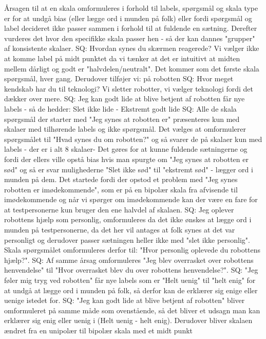 Årsagen til at en skala omformuleres i forhold til labels, spørgsmål og skala type er for at undgå bias (eller lægge ord i munden på folk) eller fordi spørgsmål og label decideret ikke passer sammen i forhold til at fuldende en sætning. Derefter vurderes det hvor den specifikke skala passer hen - så der kan dannes "grupper" af konsistente skalaer.\blankline 
%
SQ: Hvordan synes du skærmen reagerede? Vi vælger ikke at komme label på midt punktet da vi tænker at det er intuitivt at midten mellem dårligt og godt er "halvdelen/neutralt". Det kommer som det første skala spørgsmål, hver gang. Derudover tilføjer vi: på robotten\blankline
%
SQ: Hvor meget kendskab har du til teknologi? Vi sletter robotter, vi vælger teknologi fordi det dækker over mere. \blankline
%
SQ: Jeg kan godt lide at blive betjent af robotten får nye labels - så de hedder: Slet ikke lide - Ekstremt godt lide\blankline
%
SQ: Alle de skala spørgsmål der starter med "Jeg synes at robotten er" præsenteres kun med skalaer med tilhørende labels og ikke spørgsmål. Det vælges at omformulerer spørgsmålet til "Hvad synes du om robotten?" og så svarer de på skalaer kun med labels - der er i alt 8 skalaer- Det gøres for at kunne fuldende sætningerne og fordi der ellers ville opstå bias hvis man spurgte om "Jeg synes at robotten er sød" og så er svar mulighederne "Slet ikke sød" til "ekstremt sød" - lægger ord i munden på dem. Det startede fordi der opstod et problem med "Jeg synes robotten er imødekommende", som er på en bipolær skala fra afvisende til imødekommende og når vi spørger om imødekommende kan der være en fare for at testpersonerne kun bruger den ene halvdel af skalaen. \blankline
%
SQ: Jeg oplever robottens hjælp som personlig, omformuleres da det ikke ønskes at lægge ord i munden på testpersonerne, da det her vil antages at folk synes at det var personligt og derudover passer sætningen heller ikke med "slet ikke personlig". Skala spørgsmålet omformuleres derfor til: "Hvor personlig oplevede du robottens hjælp?". \blankline
%
SQ: Af samme årsag omformuleres "Jeg blev overrasket over robottens henvendelse" til "Hvor overrasket blev du over robottens henvendelse?".\blankline
%
SQ: "Jeg føler mig tryg ved robotten" får nye labels som er "Helt uenig" til "helt enig" for at undgå at lægge ord i munden på folk, så derfor kan de erklærer sig enige eller uenige istedet for.\blankline 
%
SQ: "Jeg kan godt lide at blive betjent af robotten" bliver omformuleret på samme måde som ovenstående, så det bliver et udsagn man kan erklærer sig enig eller uenig i (Helt uenig - helt enig). Derudover bliver skalaen ændret fra en unipolær til bipolær skala med et midt punkt\blankline
